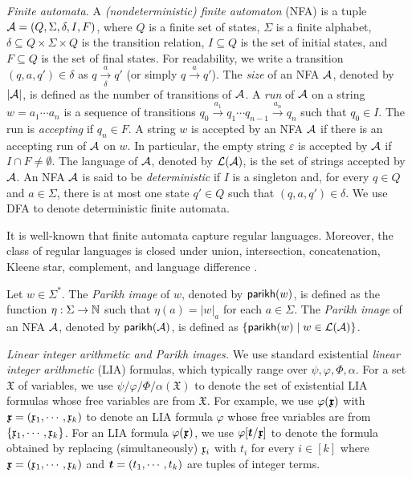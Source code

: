 \medskip
\noindent 
\emph{Finite automata.} 
A \emph{(nondeterministic) finite automaton} (NFA)  is a tuple $\mathcal{A}=(Q, \Sigma, \delta, I, F)$, where $Q$ is a finite set of states, $\Sigma$ is a finite alphabet, $\delta \subseteq Q \times \Sigma \times Q$ is the transition relation, $I \subseteq Q$ is the set of initial states, and $F \subseteq Q$ is the set of final states. For readability, we write a transition $(q, a, q') \in \delta$ as $q \xrightarrow[\delta]{a} q'$ (or simply $q \xrightarrow{a} q'$). 
The \emph{size} of an NFA $\mathcal{A}$, denoted by $|\mathcal{A}|$, is defined as the number of transitions of $\mathcal{A}$.
%
A \emph{run} of $\mathcal{A}$ on a string $w = a_1 \cdots a_n$ is a sequence of transitions $q_0 \xrightarrow{a_1} q_1 \cdots q_{n-1} \xrightarrow{a_n} q_n$ such that $q_0 \in I$. The run is \emph{accepting} if $q_n \in F$.
A string $w$ is accepted by an NFA $\mathcal{A}$ if there is an accepting run of $\mathcal{A}$ on $w$. In particular, the empty string $\varepsilon$ is accepted by $\mathcal{A}$ if $I \cap F \neq \emptyset$. The language of $\mathcal{A}$, denoted by $\mathcal{L}(\mathcal{A})$, is the set of strings accepted by $\mathcal{A}$. 
%
An NFA $\mathcal{A}$ is said to be \emph{deterministic} if $I$ is a singleton and, for every $q \in Q$ and $a \in \Sigma$, there is at most one state $q' \in Q$ such that $(q, a, q') \in \delta$. We use DFA to denote deterministic finite automata. 
%

It is well-known that finite automata capture regular languages. 
Moreover, the class of regular languages is closed under union, intersection, concatenation, Kleene star, complement, and language difference \cite{HU79}.

Let $w \in \Sigma^*$. The \emph{Parikh image} of $w$, denoted by $\mathsf{parikh}(w)$, is defined as the function $\eta: \Sigma \rightarrow \mathbb{N}$ such that $\eta(a) = |w|_a$ for each $a \in \Sigma$. The \emph{Parikh image} of an NFA $\mathcal{A}$, denoted by $\mathsf{parikh}(\mathcal{A})$, is defined as $\{\mathsf{parikh}(w) \mid w \in \mathcal{L}(\mathcal{A})\}$.

\medskip
\noindent 
\emph{Linear integer arithmetic and Parikh images.}
We use standard existential \emph{linear integer arithmetic} (LIA) formulas, which
 typically range over $\psi, \varphi, \Phi, \alpha$. 
For a set $\mathfrak{X}$ of variables, we use $\psi/\varphi/\Phi/\alpha(\mathfrak{X})$ to denote the set of existential LIA formulas whose free variables are from $\mathfrak{X}$. 
For example, we use $\varphi(\vec{\anivar})$ with $\myvec{\anivar} = (\anivar_1, \cdots, \anivar_k)$ to denote an LIA formula $\varphi$ whose free variables are from $\{\mathfrak{x}_1, \cdots, \mathfrak{x}_k\}$. For an LIA formula $\varphi(\vec{\anivar})$, we use $\varphi[\myvec{t}/\myvec{\anivar}]$ to denote the formula obtained by replacing (simultaneously) $\mathfrak{x}_i$ with $t_i$ for every $i \in [k]$ where $\myvec{\anivar} = (\anivar_1, \cdots, \anivar_k)$ and $\myvec{t} = (t_1, \cdots, t_k)$ are tuples of integer terms.

